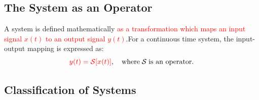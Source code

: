 \documentclass[
  12pt,
  a4paper,
]{report}
\begin{document}
\subsection{The System as an Operator}\label{the-system-as-an-operator}

\begin{tcolorbox}[colback=boxbodycol,colframe=boxheadcol,title=\textcolor{red}{\textbf{The System Operator}}]    
A system is defined mathematically \textcolor{red}{as a transformation which maps an input signal \(x(t)\) to an output signal \(y(t)\)}.For a continuous time system, the input-output mapping is expressed as:
\begin{equation}
    \label{eq:system-operator-def-equation}
    \textcolor{red}{y(t) = \mathcal{S}[x(t)]}, \quad \text{where} \; \mathcal{S} \; \text{is an operator.}
\end{equation}
\begin{center}
\end{center}
\end{tcolorbox}

\subsection{Classification of Systems}\label{classification-of-systems}

\newpage{}

\newpage{}
\end{document}
